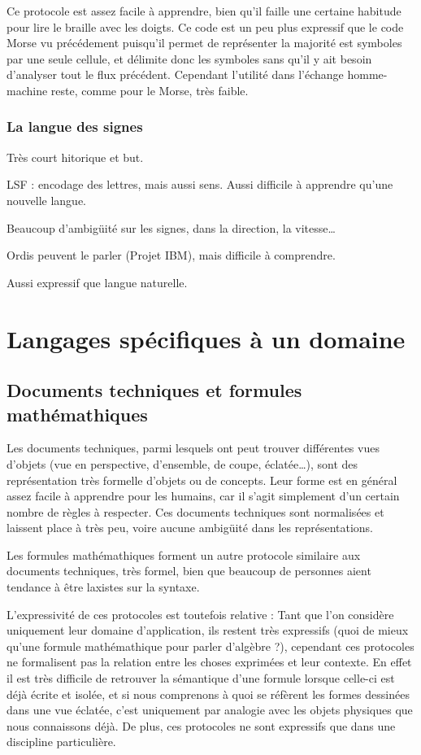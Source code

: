 \documentclass[french,a4paper]{article}
\begin{document}
Ce protocole est assez facile à apprendre, bien qu'il faille une certaine habitude pour lire le braille avec les doigts. Ce code est un peu
plus expressif que le code Morse vu précédement puisqu'il permet de représenter la majorité est symboles par une seule cellule, et délimite
donc les symboles sans qu'il y ait besoin d'analyser tout le flux précédent. Cependant l'utilité dans l'échange homme-machine reste, comme
pour le Morse, très faible.

\subsubsection{La langue des signes}
Très court hitorique et but.

LSF : encodage des lettres, mais aussi sens. Aussi difficile à apprendre qu'une nouvelle langue.

Beaucoup d'ambigüité sur les signes, dans la direction, la vitesse…

Ordis peuvent le parler (Projet IBM), mais difficile à comprendre.

Aussi expressif que langue naturelle.

\section{Langages spécifiques à un domaine}
\subsection{Documents techniques et formules mathémathiques}

Les documents techniques, parmi lesquels ont peut trouver différentes vues d'objets (vue en perspective, d'ensemble, de coupe, éclatée…),
sont des représentation très formelle d'objets ou de concepts. Leur forme est en général assez facile à apprendre pour les humains, car il
s'agit simplement d'un certain nombre de règles à respecter. Ces documents techniques sont normalisées et laissent place à très peu, voire
aucune ambigüité dans les représentations.

Les formules mathémathiques forment un autre protocole similaire aux documents techniques, très formel, bien que beaucoup de personnes aient
tendance à être laxistes sur la syntaxe.

L'expressivité de ces protocoles est toutefois relative : Tant que l'on considère uniquement leur domaine d'application, ils restent très
expressifs (quoi de mieux qu'une formule mathémathique pour parler d'algèbre ?), cependant ces protocoles ne formalisent pas la relation
entre les choses exprimées et leur contexte. En effet il est très difficile de retrouver la sémantique d'une formule lorsque celle-ci est
déjà écrite et isolée, et si nous comprenons à quoi se réfèrent les formes dessinées dans une vue éclatée, c'est uniquement par analogie
avec les objets physiques que nous connaissons déjà. De plus, ces protocoles ne sont expressifs que dans une discipline particulière.
\end{document}
